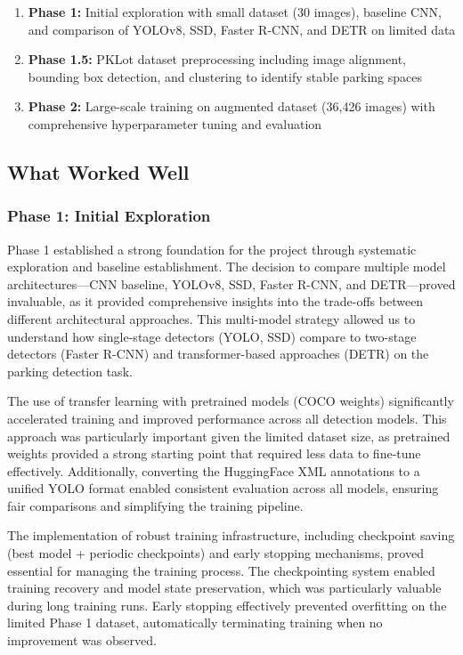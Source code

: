 \documentclass[12pt,a4paper]{article}
\begin{document}
\begin{enumerate}
    \item \textbf{Phase 1:} Initial exploration with small dataset (30 images), baseline CNN, and comparison of YOLOv8, SSD, Faster R-CNN, and DETR on limited data
    \item \textbf{Phase 1.5:} PKLot dataset preprocessing including image alignment, bounding box detection, and clustering to identify stable parking spaces
    \item \textbf{Phase 2:} Large-scale training on augmented dataset (36,426 images) with comprehensive hyperparameter tuning and evaluation
\end{enumerate}

\subsection{What Worked Well}

\subsubsection{Phase 1: Initial Exploration}

Phase 1 established a strong foundation for the project through systematic exploration and baseline establishment. The decision to compare multiple model architectures—CNN baseline, YOLOv8, SSD, Faster R-CNN, and DETR—proved invaluable, as it provided comprehensive insights into the trade-offs between different architectural approaches. This multi-model strategy allowed us to understand how single-stage detectors (YOLO, SSD) compare to two-stage detectors (Faster R-CNN) and transformer-based approaches (DETR) on the parking detection task.

The use of transfer learning with pretrained models (COCO weights) significantly accelerated training and improved performance across all detection models. This approach was particularly important given the limited dataset size, as pretrained weights provided a strong starting point that required less data to fine-tune effectively. Additionally, converting the HuggingFace XML annotations to a unified YOLO format enabled consistent evaluation across all models, ensuring fair comparisons and simplifying the training pipeline.

The implementation of robust training infrastructure, including checkpoint saving (best model + periodic checkpoints) and early stopping mechanisms, proved essential for managing the training process. The checkpointing system enabled training recovery and model state preservation, which was particularly valuable during long training runs. Early stopping effectively prevented overfitting on the limited Phase 1 dataset, automatically terminating training when no improvement was observed.
\end{document}
